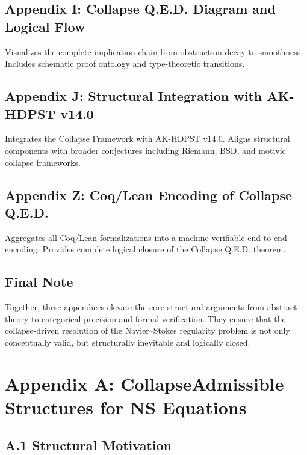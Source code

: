 \documentclass[11pt]{article}
\begin{document}
\subsection*{Appendix I: Collapse Q.E.D. Diagram and Logical Flow}
Visualizes the complete implication chain from obstruction decay to smoothness. Includes schematic proof ontology and type-theoretic transitions.

\subsection*{Appendix J: Structural Integration with AK-HDPST v14.0}
Integrates the Collapse Framework with AK-HDPST v14.0. Aligns structural components with broader conjectures including Riemann, BSD, and motivic collapse frameworks.

\subsection*{Appendix Z: Coq/Lean Encoding of Collapse Q.E.D.}
Aggregates all Coq/Lean formalizations into a machine-verifiable end-to-end encoding. Provides complete logical closure of the Collapse Q.E.D. theorem.

\subsection*{Final Note}
Together, these appendices elevate the core structural arguments from abstract theory to categorical precision and formal verification. They ensure that the collapse-driven resolution of the Navier--Stokes regularity problem is not only conceptually valid, but structurally inevitable and logically closed.




\appendix
\section*{Appendix A: \texorpdfstring{CollapseAdmissible Structures for NS Equations}{CollapseAdmissible Structures for NS Equations}}

\subsection{A.1 Structural Motivation}
\end{document}
